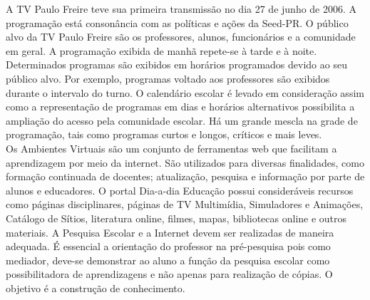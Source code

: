 \documentclass[a4paper, 12pt]{article}
\begin{document}
\begin{enumerate}
\begin{enumerate}
      A TV Paulo Freire teve sua primeira transmissão no dia 27 de junho de 2006. A programação está consonância com as políticas e ações da Seed-PR. O público alvo da TV Paulo Freire são os professores, alunos, funcionários e a comunidade em geral. A programação exibida de manhã repete-se à tarde e à noite. Determinados programas são exibidos em horários programados devido ao seu público alvo. Por exemplo, programas voltado aos professores são exibidos durante o intervalo do turno. O calendário escolar é levado em consideração assim como a representação de programas em dias e horários alternativos possibilita a ampliação do acesso pela comunidade escolar. Há um grande mescla na grade de programação, tais como programas curtos e longos, críticos e mais leves. \\
      Os Ambientes Virtuais são um conjunto de ferramentas web que facilitam a aprendizagem por meio da internet. São utilizados para diversas finalidades, como formação continuada de docentes; atualização, pesquisa e informação por parte de alunos e educadores. O portal Dia-a-dia Educação possui consideráveis recursos como páginas disciplinares, páginas de TV Multimídia, Simuladores e Animações, Catálogo de Sítios, literatura online, filmes, mapas, bibliotecas online e outros materiais.
      A Pesquisa Escolar e a Internet devem ser realizadas de maneira adequada. É essencial a orientação do professor na pré-pesquisa pois como mediador, deve-se demonstrar ao aluno a função da pesquisa escolar como possibilitadora de aprendizagens e não apenas para realização de cópias. O objetivo é a construção de conhecimento.
      

\end{enumerate}
\end{enumerate}
\end{document}

